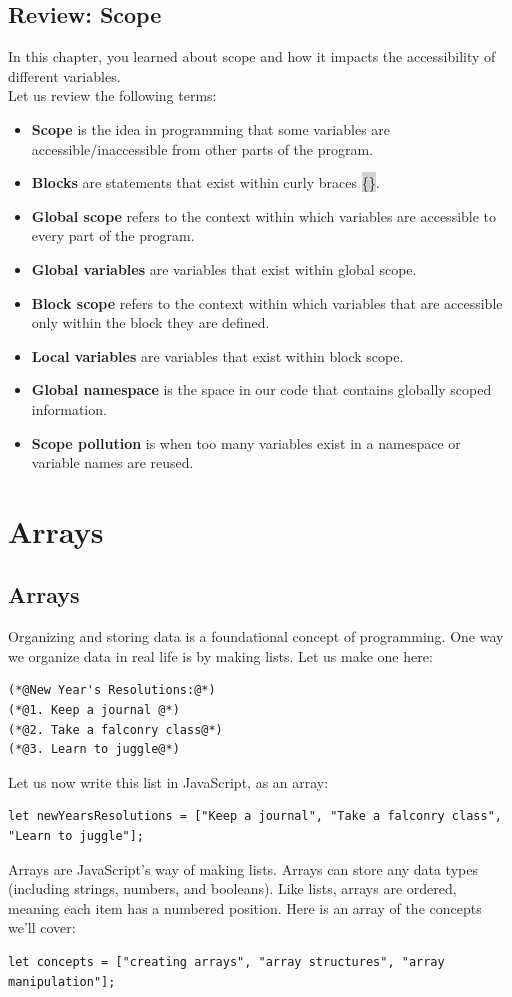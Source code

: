 \documentclass[11pt]{article}
\begin{document}
\subsection{Review: Scope}
In this chapter, you learned about scope and how it impacts the accessibility of different variables. \\
Let us review the following terms:
\begin{itemize}[leftmargin = *]
\item \textbf{Scope} is the idea in programming that some variables are accessible/inaccessible from other parts of the program.
\item \textbf{Blocks} are statements that exist within curly braces \colorbox{lightgray}{\{\}}.
\item \textbf{Global scope} refers to the context within which variables are accessible to every part of the program.
\item \textbf{Global variables} are variables that exist within global scope.
\item \textbf{Block scope} refers to the context within which variables that are accessible only within the block they are defined.
\item \textbf{Local variables} are variables that exist within block scope.
\item \textbf{Global namespace} is the space in our code that contains globally scoped information.
\item \textbf{Scope pollution} is when too many variables exist in a namespace or variable names are reused.
\end{itemize}

\newpage
\section{Arrays}
\subsection{Arrays}
Organizing and storing data is a foundational concept of programming. One way we organize data in real life is by making lists. Let us make one here:
\begin{lstlisting}
(*@New Year's Resolutions:@*)
(*@1. Keep a journal @*)
(*@2. Take a falconry class@*)
(*@3. Learn to juggle@*)
\end{lstlisting}
Let us now write this list in JavaScript, as an array:
\begin{lstlisting}
let newYearsResolutions = ["Keep a journal", "Take a falconry class", "Learn to juggle"];
\end{lstlisting}
Arrays are JavaScript’s way of making lists. Arrays can store any data types (including strings, numbers, and booleans). Like lists, arrays are ordered, meaning each item has a numbered position.
Here is an array of the concepts we’ll cover:
\begin{lstlisting}
let concepts = ["creating arrays", "array structures", "array manipulation"];
\end{lstlisting}
\end{document}
